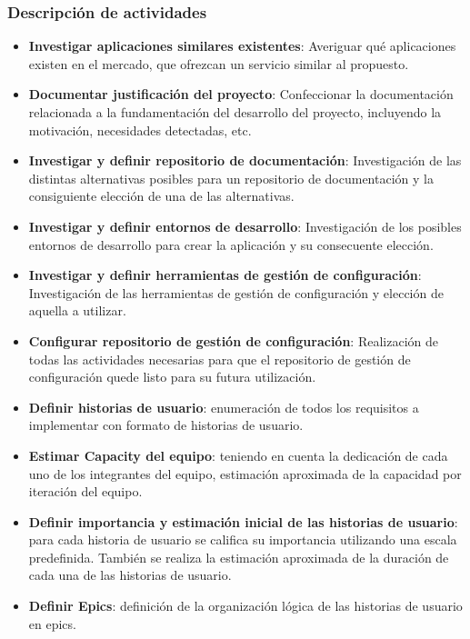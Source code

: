 \subsubsection{Descripción de actividades}

\begin{itemize}
    \item{\textbf{Investigar aplicaciones similares existentes}:}
    Averiguar qué aplicaciones existen en el mercado, que ofrezcan un servicio similar al propuesto.
    \item{\textbf{Documentar justificación del proyecto}:}
    Confeccionar la documentación relacionada a la fundamentación del desarrollo del proyecto, incluyendo la motivación, necesidades detectadas, etc.
    \item{\textbf{Investigar y definir repositorio de documentación}:}
    Investigación de las distintas alternativas posibles para un repositorio de documentación y la consiguiente elección de una de las alternativas.
    \item{\textbf{Investigar y definir entornos de desarrollo}:}
    Investigación de los posibles entornos de desarrollo para crear la aplicación y su consecuente elección.
    \item{\textbf{Investigar y definir herramientas de gestión de configuración}:}
    Investigación de las herramientas de gestión de configuración y elección de aquella a utilizar.
    \item{\textbf{Configurar repositorio de gestión de configuración}:}
    Realización de todas las actividades necesarias para que el repositorio de gestión de configuración quede listo para su futura utilización. 
    \item{\textbf{Definir historias de usuario}:} 
    enumeración de todos los requisitos a implementar con formato de historias de usuario.
    \item{\textbf{Estimar Capacity del equipo}:}
    teniendo en cuenta la dedicación de cada uno de los integrantes del equipo, estimación aproximada de la capacidad por iteración del equipo.
    \item{\textbf{Definir importancia y estimación inicial de las historias de usuario}:}
    para cada historia de usuario se califica su importancia utilizando una escala predefinida. 
    También se realiza la estimación aproximada de la duración de cada una de las historias de usuario.
    \item{\textbf{Definir Epics}:}
    definición de la organización lógica de las historias de usuario en epics.

\end{itemize}
